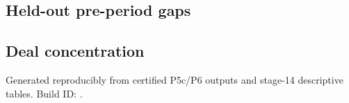 \documentclass[10pt,a4paper]{article}
\begin{document}
\subsection{Held-out pre-period gaps}


\subsection{Deal concentration}


\vfill
\begin{center}
\footnotesize\color{ThesisGrey}
Generated reproducibly from certified P5c/P6 outputs and stage-14 descriptive
tables. Build ID: \BuildID.
\end{center}
\end{document}
